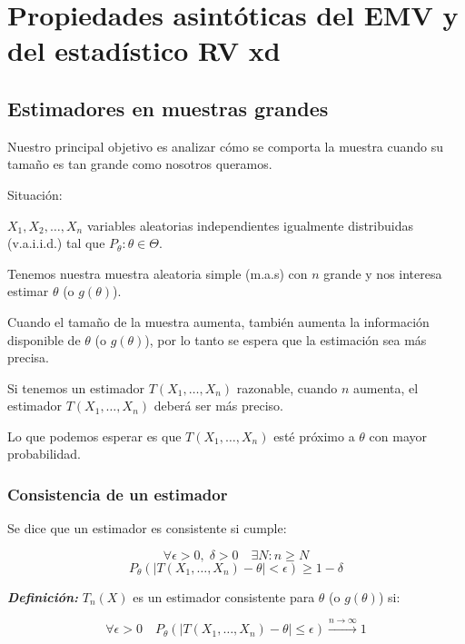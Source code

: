 \section{Propiedades asintóticas del EMV y del estadístico RV xd}


\subsection{Estimadores en muestras grandes}

Nuestro principal objetivo es analizar cómo se comporta la muestra cuando su tamaño es tan grande como nosotros queramos.
\setlength{\parskip}{1em}   %

Situación:
\setlength{\parskip}{0em}   %

\( X_1, X_2, \dots, X_n \) variables aleatorias independientes igualmente distribuidas (v.a.i.i.d.) tal que \( P_\theta:\theta  \in  \Theta\).

Tenemos nuestra muestra aleatoria simple (m.a.s) con \( n \) grande y nos interesa estimar \( \theta \) (o \( g(\theta) \)).

\setlength{\parskip}{1em}   %
Cuando el tamaño de la muestra aumenta, también aumenta la información disponible de \( \theta \) (o \( g(\theta) \)), por lo tanto se espera que la estimación sea más precisa.

Si tenemos un estimador \( T(X_1, \dots, X_n) \) razonable, cuando \( n \) aumenta, el estimador \( T(X_1, \dots, X_n) \) deberá ser más preciso.

\setlength{\parskip}{0em}   %
Lo que podemos esperar es que \( T(X_1, \dots, X_n) \) esté próximo a \( \theta \) con mayor probabilidad.

\subsubsection{Consistencia de un estimador}

Se dice que un estimador es consistente si cumple:
\setlength{\parskip}{1em}

\[\forall \epsilon > 0, \; \delta > 0 \quad \exists N: n \geq N\]
\[P_\theta\left(|T(X_1, \dots, X_n) - \theta| < \epsilon\right) \geq 1 - \delta\]

\textbf{\textit{Definición: }} \(T_n(X)\) es un estimador consistente para \(\theta\) (o \(g(\theta)\)) si:

\[
    \forall \epsilon > 0 \quad P_\theta\left(|T(X_1, \dots, X_n) - \theta| \leq \epsilon\right) \xrightarrow{n \to \infty} 1
\]

